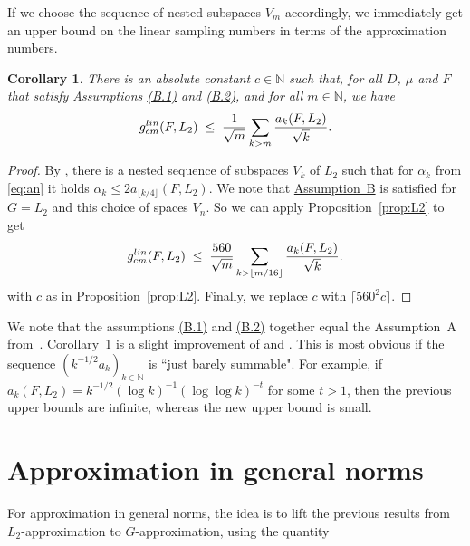\documentclass[a4paper,12pt]{amsart}
\newtheorem{corollary}[theorem]{Corollary}
\theoremstyle{definition}
\theoremstyle{remark}
\begin{document}
If we choose the sequence of nested subspaces $V_m$ accordingly,
we immediately get an upper bound on the linear sampling numbers in terms of the approximation numbers.

\begin{corollary}\label{coro:L2}
There is an absolute constant $c\in \mathbb{N}$ such that,
for all $D$, $\mu$ and $F$ that satisfy 
Assumptions \hyperlink{assum}{(B.1)} and \hyperlink{assum}{(B.2)},
and for all $m\in\mathbb{N}$, we have 
\[
g_{cm}^{\rm lin}(F,L_2) 
\;\le\; \frac{1}{\sqrt{m}}\sum_{k > m} \frac{ a_k(F,L_2)}{\sqrt{k}}.
\]
\end{corollary}

\begin{proof}
By \cite[Lemma~3]{KU2}, there is a nested sequence of subspaces  {$V_k$} of $L_2$ such that {for $\alpha_k$ from \eqref{eq:an} it holds}
$
{\alpha_k}
 \le 2 a_{\lfloor k/4 \rfloor}(F,L_2)
$.
{We note that 
\hyperlink{assum}
{Assumption~B} is satisfied for $G=L_2$ and this choice of spaces $V_n$. So we can apply}
Proposition~\ref{prop:L2} to get
\[
g_{cm}^{\rm lin}(F,L_2) 
\;\le\; \frac{560}{\sqrt{m}}\sum_{k > \lfloor m/16 \rfloor} \frac{ a_k(F,L_2)}{\sqrt{k}}.
\]
with $c$ as in Proposition~\ref{prop:L2}.
Finally, we replace $c$ with $\lceil 560^2c \rceil$.
\end{proof}

\sloppy
We note that the assumptions 
\hyperlink{assum}
{(B.1)} and 
\hyperlink{assum}
{(B.2)} together equal the Assumption~A from~\cite{DKU}.
Corollary~\ref{coro:L2} is a slight improvement of \cite[Thm.~3]{DKU} and \cite[Thm.~27]{DKU}. 
{This is most obvious if the sequence $(k^{-1/2} a_k)_{k\in\mathbb{N}}$ is ``just barely summable". 
For example, if $a_k{(F,L_2)}= k^{-1/2} (\log k)^{-1} (\log\log k)^{-t}$ for some $t>1$,
then the previous upper bounds are infinite, whereas the new upper bound is small}.



\bigskip

\section{Approximation in general norms}\label{sec:general}

For approximation in general norms, 
the idea is to lift the previous results from $L_2$-approximation to $G$-approximation, using 
the quantity 
\end{document}
